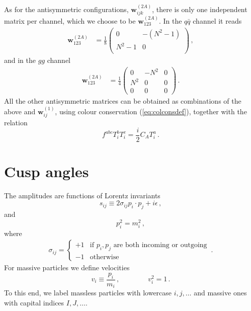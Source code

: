 \documentclass[a4paper,11pt]{article}
\newcommand{\qqbar}{{\ensuremath{q \bar q}}\xspace}
\newcommand{\bfw}{\bm{w}}
\newcommand{\iep}{\ensuremath{i \epsilon}}
\numberwithin{equation}{section}
\begin{document}
As for the antisymmetric configurations, $\bm{w}_{ijk}^{(2A)}$, there is only
one independent matrix per channel, which we choose to be $\bm{w}_{123}^{(2A)}$. In the $\qqbar$ channel it reads
%
\begin{eqnarray}
  \bm{w}_{123}^{(2A)} & =
  \frac{1}{8} \left(
  \begin{array}{cc}
  0     & -(N^2-1) \\
  N^2-1 & 0 \\
  \end{array}
  \right)\,,
  \label{eq:w2Aqq}
\end{eqnarray}
%
and in the $gg$ channel
%
\begin{eqnarray}
  \bm{w}_{123}^{(2A)} & =
  \frac{1}{4} \left(
  \begin{array}{ccc}
  0    & -N^2 & 0 \\
  N^2 & 0   & 0 \\
  0    & 0   & 0
  \end{array}
  \right)\,.
  \label{eq:w2Agg}
\end{eqnarray}
%
All the other antisymmetric matrices can be obtained  as combinations of the
above and $\bfw_{ij}^{(1)}$, using colour conservation (\ref{eq:colconsdef}),
together with the relation
%
\begin{equation}
  f^{abc} T^b_i T^c_i = \frac{i}{2} C_A T^a_i\,.
\end{equation}


\section{Cusp angles}

The amplitudes are functions of Lorentz invariants~\cite{Becher:2009kw}
%
\begin{equation}
  s_{ij} \equiv 2 \sigma_{ij} p_i \cdot p_j + \iep\,,
  \label{eq:sij-def}
\end{equation}
%
and
\begin{equation}
  p_i^2 = m_i^2\,,
\end{equation}
%
where
%
\begin{eqnarray}
  \sigma_{ij} = \left\{
    \begin{array}{cl} 
      + 1 &  \text{if } p_i, p_j \text{ are both incoming or outgoing} \\
      - 1 &  \text{otherwise}
    \end{array}
    \right.\,.
\end{eqnarray}
%
For massive particles we define velocities
%
\begin{equation}
  v_i \equiv  \frac{p_i}{m_i}\,,
  \qquad \qquad v_i^2 = 1\,.
\end{equation}
%
To this end,
we label massless particles with lowercase $i, j, \ldots$ and massive
ones with capital indices $I, J, \ldots$.
\end{document}
